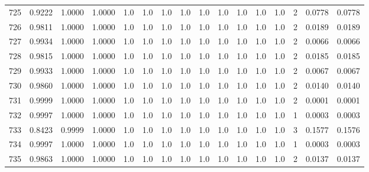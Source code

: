 \begin{tabular}{lrrrrrrrrrrrrrrr}
725 &      0.9222 &  1.0000 &  1.0000 &     1.0 &     1.0 &     1.0 &     1.0 &     1.0 &     1.0 &     1.0 &      1.0 &        1.0 &      2 &                    0.0778 &                     0.0778 \\
726 &      0.9811 &  1.0000 &  1.0000 &     1.0 &     1.0 &     1.0 &     1.0 &     1.0 &     1.0 &     1.0 &      1.0 &        1.0 &      2 &                    0.0189 &                     0.0189 \\
727 &      0.9934 &  1.0000 &  1.0000 &     1.0 &     1.0 &     1.0 &     1.0 &     1.0 &     1.0 &     1.0 &      1.0 &        1.0 &      2 &                    0.0066 &                     0.0066 \\
728 &      0.9815 &  1.0000 &  1.0000 &     1.0 &     1.0 &     1.0 &     1.0 &     1.0 &     1.0 &     1.0 &      1.0 &        1.0 &      2 &                    0.0185 &                     0.0185 \\
729 &      0.9933 &  1.0000 &  1.0000 &     1.0 &     1.0 &     1.0 &     1.0 &     1.0 &     1.0 &     1.0 &      1.0 &        1.0 &      2 &                    0.0067 &                     0.0067 \\
730 &      0.9860 &  1.0000 &  1.0000 &     1.0 &     1.0 &     1.0 &     1.0 &     1.0 &     1.0 &     1.0 &      1.0 &        1.0 &      2 &                    0.0140 &                     0.0140 \\
731 &      0.9999 &  1.0000 &  1.0000 &     1.0 &     1.0 &     1.0 &     1.0 &     1.0 &     1.0 &     1.0 &      1.0 &        1.0 &      2 &                    0.0001 &                     0.0001 \\
732 &      0.9997 &  1.0000 &  1.0000 &     1.0 &     1.0 &     1.0 &     1.0 &     1.0 &     1.0 &     1.0 &      1.0 &        1.0 &      1 &                    0.0003 &                     0.0003 \\
733 &      0.8423 &  0.9999 &  1.0000 &     1.0 &     1.0 &     1.0 &     1.0 &     1.0 &     1.0 &     1.0 &      1.0 &        1.0 &      3 &                    0.1577 &                     0.1576 \\
734 &      0.9997 &  1.0000 &  1.0000 &     1.0 &     1.0 &     1.0 &     1.0 &     1.0 &     1.0 &     1.0 &      1.0 &        1.0 &      1 &                    0.0003 &                     0.0003 \\
735 &      0.9863 &  1.0000 &  1.0000 &     1.0 &     1.0 &     1.0 &     1.0 &     1.0 &     1.0 &     1.0 &      1.0 &        1.0 &      2 &                    0.0137 &                     0.0137 \\

\end{tabular}
